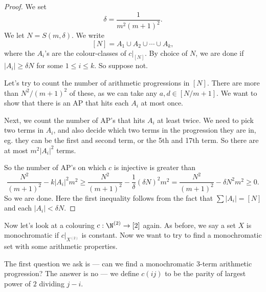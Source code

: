 \documentclass[a4paper]{article}
\begin{document}
\begin{proof}
  We set
  \[
    \delta = \frac{1}{m^2(m + 1)^2}.
  \]
  We let $N = S(m, \delta)$. We write
  \[
    [N] = A_1 \cup A_2 \cup \cdots \cup A_k,
  \]
  where the $A_i$'s are the colour-classes of $c|_{[N]}$. By choice of $N$, we are done if $|A_i| \geq \delta N$ for some $1 \leq i \leq k$. So suppose not.

  Let's try to count the number of arithmetic progressions in $[N]$. There are more than $N^2/(m + 1)^2$ of these, as we can take any $a, d \in [N/m + 1]$. We want to show that there is an AP that hits each $A_i$ at most once.

  Next, we count the number of AP's that hits $A_i$ at least twice. We need to pick two terms in $A_i$, and also decide which two terms in the progression they are in, eg. they can be the first and second term, or the 5th and 17th term. So there are at most $m^2 |A_i|^2$ terms.

  So the number of AP's on which $c$ is injective is greater than
  \[
    \frac{N^2}{(m + 1)^2} - k |A_i|^2 m^2 \geq \frac{N^2}{(m + 1)^2} - \frac{1}{\delta} (\delta N)^2 m^2 = \frac{N^2}{(m + 1)^2} - \delta N^2 m^2 \geq 0.
  \]
  So we are done. Here the first inequality follows from the fact that $\sum |A_i| = [N]$ and each $|A_i| < \delta N$.
\end{proof}

Now let's look at a colouring $c: \N^{(2)} \to [2]$ again. As before, we say a set $X$ is monochromatic if $c|_{X^{(2)}}$ is constant. Now we want to try to find a monochromatic set with some arithmetic properties.

The first question we ask is --- can we find a monochromatic 3-term arithmetic progression? The answer is no --- we define $c(ij)$ to be the parity of largest power of $2$ dividing $j - i$.
\end{document}
